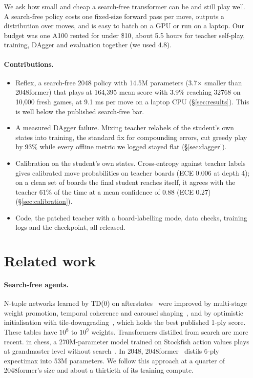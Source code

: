 \documentclass{article}
\newcommand{\method}{Reflex}
\begin{document}
We ask how small and cheap a search-free transformer can be and still play well.
A search-free policy costs one fixed-size forward pass per move, outputs a distribution over moves, and is easy to batch on a GPU or run on a laptop.
Our budget was one A100 rented for under \$10, about 5.5 hours for teacher self-play, training, DAgger and evaluation together (we used 4.8).

\paragraph{Contributions.}
\begin{itemize}[leftmargin=*,nosep]
  \item \method{}, a search-free 2048 policy with 14.5M parameters (3.7$\times$ smaller than 2048former) that plays at 164{,}395 mean score with 3.9\% reaching 32768 on 10{,}000 fresh games, at 9.1 ms per move on a laptop CPU (\S\ref{sec:results}). This is well below the published search-free bar.
  \item A measured DAgger failure. Mixing teacher relabels of the student's own states into training, the standard fix for compounding errors, cut greedy play by 93\% while every offline metric we logged stayed flat (\S\ref{sec:dagger}).
  \item Calibration on the student's own states. Cross-entropy against teacher labels gives calibrated move probabilities on teacher boards (ECE 0.006 at depth 4); on a clean set of boards the final student reaches itself, it agrees with the teacher 61\% of the time at a mean confidence of 0.88 (ECE 0.27) (\S\ref{sec:calibration}).
  \item Code, the patched teacher with a board-labelling mode, data checks, training logs and the checkpoint, all released.
\end{itemize}

\section{Related work}

\paragraph{Search-free agents.}
N-tuple networks learned by TD(0) on afterstates~\citep{szubert2014temporal} were improved by multi-stage weight promotion, temporal coherence and carousel shaping~\citep{jaskowski2016mastering,yeh2016multistage}, and by optimistic initialisation with tile-downgrading~\citep{guei2021optimistic}, which holds the best published 1-ply score.
These tables have $10^8$ to $10^9$ weights.
Transformers distilled from search are more recent. in chess, a 270M-parameter model trained on Stockfish action values plays at grandmaster level without search~\citep{ruoss2024amortized}. In 2048, 2048former~\citep{keisling2025former} distils 6-ply expectimax into 53M parameters.
We follow this approach at a quarter of 2048former's size and about a thirtieth of its training compute.
\end{document}
